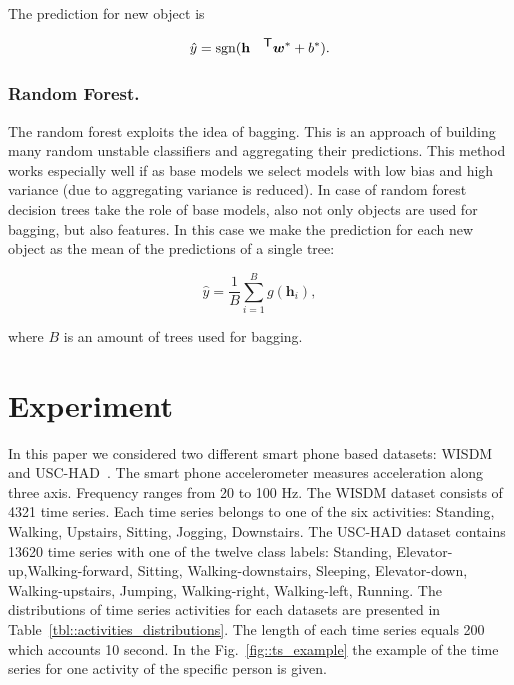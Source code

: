 \documentclass{llncs}
\DeclareMathOperator{\sgn}{\mathop{sgn}}
\newcommand{\T}{{\mbox{\footnotesize\sffamily\upshape\mdseries T}}}
\begin{document}
The prediction for new object is

\begin{equation*}
\hat{y} = \sgn (\mathbf{h}^{\T} \bm{w}^* + b^*).
\end{equation*}

\subsubsection{Random Forest.}
The random forest exploits the idea of bagging. This is an approach of building many random unstable classifiers and aggregating their predictions. This method works especially well if as base models we select models with low bias and high variance (due to aggregating variance is reduced). In case of random forest decision trees take the role of base models, also not only objects are used for bagging, but also features. In this case we make the prediction for each new object as the mean of the predictions of a single tree:

\begin{equation*}
\hat{y} = \frac{1}{B} \sum_{i=1}^{B} g(\mathbf{h}_i),
\end{equation*}

where $B$ is an amount of trees used for bagging.

\section{Experiment}
In this paper we considered two different smart phone based datasets: WISDM~\cite{wisdm} and USC-HAD~\cite{usc}. 
The smart phone accelerometer measures acceleration along three axis. 
Frequency ranges from 20 to 100 Hz. 
The WISDM dataset consists of 4321 time series. Each time series belongs to one of the six activities: Standing, Walking, Upstairs, Sitting, Jogging, Downstairs. The USC-HAD dataset contains 13620 time series with one of the twelve class labels: Standing, Elevator-up,Walking-forward, Sitting, Walking-downstairs, Sleeping, Elevator-down, Walking-upstairs, Jumping, Walking-right, Walking-left, Running.
The distributions of time series activities for each datasets are presented in Table~\ref{tbl::activities_distributions}. 
The length of each time series equals 200 which accounts 10 second. 
In the Fig.~\ref{fig::ts_example} the example of the time series for one activity of the specific person is given.
\end{document}
